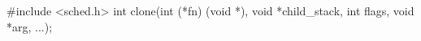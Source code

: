 \documentclass[varwidth=24.2em,crop]{standalone}
\begin{document}
\begin{ccode}
#include <sched.h>
int clone(int (*fn) (void *), void *child_stack,
          int flags, void *arg, ...);        
\end{ccode}
\end{document}
